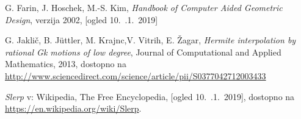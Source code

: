 \documentclass[12pt,a4paper,twoside]{article}
\theoremstyle{definition} %
\theoremstyle{plain} %
\numberwithin{equation}{section}  %
\begin{document}
%
%
%
%

\begin{thebibliography}{99}

G. Farin, J. Hoschek, M.-S. Kim, \emph{Handbook of Computer Aided Geometric Design}, verzija 2002, [ogled 10.~.1.~2019]

G. Jaklič, B. Jüttler, M. Krajnc,V. Vitrih, E. Žagar, \emph{Hermite interpolation by rational Gk motions of low degree}, Journal of Computational and Applied Mathematics, 2013, dostopno na \url{http://www.sciencedirect.com/science/article/pii/S0377042712003433}

\emph{Slerp} v: Wikipedia, The Free Encyclopedia, [ogled 10.~.1.~2019], dostopno na \url{ https://en.wikipedia.org/wiki/Slerp}.

\end{thebibliography}
\end{document}
